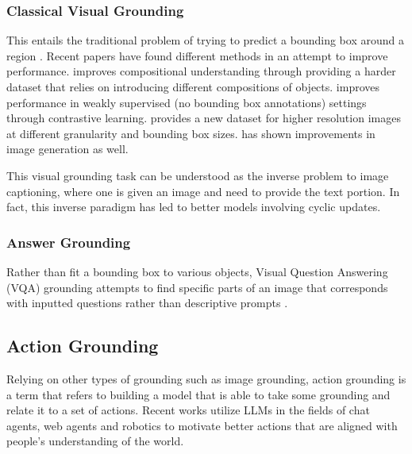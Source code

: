\documentclass[11pt]{article}
\begin{document}
\subsubsection{Classical Visual Grounding}
This entails the traditional problem of trying to predict a bounding box around a region \cite{li-etal-2024-groundinggpt,huang2021deconfoundedvisualgrounding,peng2023kosmos2groundingmultimodallarge}. Recent papers have found different methods in an attempt to improve performance.  \citet{Zeng_2024_CVPR_Comp_Challenge} improves compositional understanding through providing a harder dataset that relies on introducing different compositions of objects. \citet{neurips_zhang_contrastive_learning} improves performance in weakly supervised (no bounding box annotations) settings through contrastive learning. \citet{gigapixel} provides a new dataset for higher resolution images at different granularity and bounding box sizes. \citet{lee2024regroundimprovingtextualspatial} has shown improvements in image generation as well.

This visual grounding task can be understood as the inverse problem to image captioning, where one is given an image and need to provide the text portion. In fact, this inverse paradigm has led to better models \cite{wang2023cycleconsistencylearningcaptioninggrounding} involving cyclic updates.

\subsubsection{Answer Grounding}
Rather than fit a bounding box to various objects, Visual Question Answering (VQA) grounding attempts to find specific parts of an image that corresponds with inputted questions rather than descriptive prompts \cite{chen2022groundinganswersvisualquestions, Chen_2023_ICCV_vqa}.

\subsection{Action Grounding}
\label{sec:action}
Relying on other types of grounding such as image grounding, action grounding is a term that refers to building a model that is able to take some grounding and relate it to a set of actions. Recent works utilize LLMs in the fields of chat agents, web agents and robotics \cite{zhang2023llavagroundinggroundedvisualchat, cheng-etal-2024-seeclick,zheng2024gpt4visiongeneralistwebagent,Tellex_Kollar_Dickerson_Walter_Banerjee_Teller_Roy_2011_robotic_navigation,wang2023programmaticallygroundedcompositionallygeneralizable} to motivate better actions that are aligned with people's understanding of the world.
\end{document}
